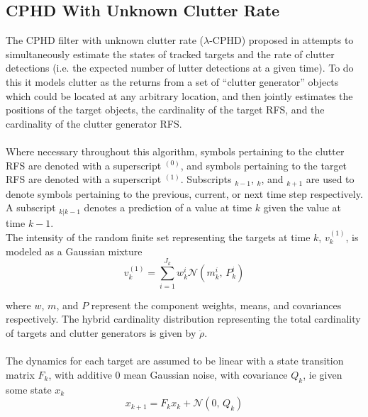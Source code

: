 \documentclass{article}
\begin{document}
\subsection*{CPHD With Unknown Clutter Rate}
The CPHD filter with unknown clutter rate ($\lambda$-CPHD) proposed in \cite{cphd} attempts to simultaneously estimate the states of tracked targets and the rate of clutter detections (i.e. the expected number of lutter detections at a given time). To do this it models clutter as the returns from a set of ``clutter generator'' objects which could be located at any arbitrary location, and then jointly estimates the positions of the target objects, the cardinality of the target RFS, and the cardinality of the clutter generator RFS. \\
\\
Where necessary throughout this algorithm, symbols pertaining to the clutter RFS are denoted with a superscript $^{(0)}$, and symbols pertaining to the target RFS are denoted with a superscript $^{(1)}$. Subscripts $_{k-1}$, $_k$, and $_{k+1}$ are used to denote symbols pertaining to the previous, current, or next time step respectively. A subscript $_{k|k-1}$ denotes a prediction of a value at time $k$ given the value at time $k-1$.
\\
The intensity of the random finite set representing the targets at time $k$, $v^{(1)}_k$, is modeled as a Gaussian mixture
\begin{equation}
  \label{eq:vk-1}
  v^{(1)}_k = \sum_{i = 1}^{J_k}w_k^i \mathcal{N}(m_k^i,\,P_k^i)
\end{equation}

where $w$, $m$, and $P$ represent the component weights, means, and covariances respectively. The hybrid cardinality distribution representing the total cardinality of targets and clutter generators is given by $\ddot{\rho}$. \\
\\
The dynamics for each target are assumed to be linear with a state transition matrix $F_k$, with additive 0 mean Gaussian noise, with covariance $Q_k$, ie given some state $x_k$
\begin{equation}
  \label{eq:tgt_dynamics}
  x_{k+1} = F_kx_k + \mathcal{N}(0,\,Q_k)
\end{equation}
\end{document}
